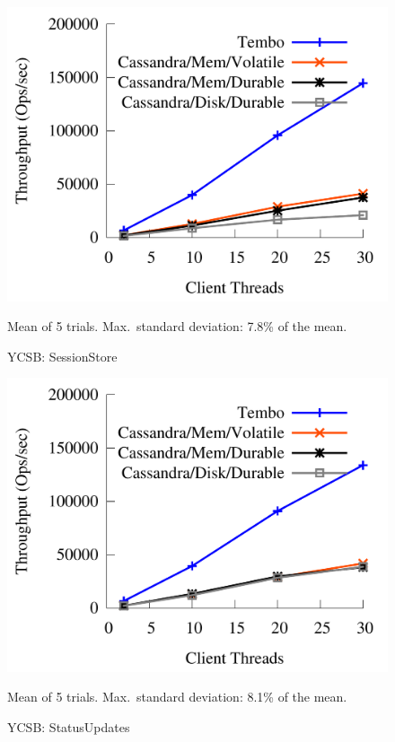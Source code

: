 \begin{figure}[t]
\begin{minipage}[b]{0.49\textwidth}
\centerline{\includegraphics[width=0.85\columnwidth]{figs/ycsb-a}}
\begin{captiontext}
 \centerline{Mean of 5 trials. Max.\ standard deviation: 7.8\% of the
   mean.}
\end{captiontext}
\caption[Yahoo Cloud Serving Benchmark: SessionStore]{YCSB: SessionStore}
\label{fig:ycsb_session_store}
\end{minipage}
\begin{minipage}[b]{0.49\textwidth}
\centerline{\includegraphics[width=0.85\columnwidth]{figs/ycsb-d}}
\begin{captiontext}
\centerline{Mean of 5 trials. Max.\ standard deviation: 8.1\% of the
  mean.}
\end{captiontext}
\caption[Yahoo Cloud Serving Benchmark: StatusUpdates]{YCSB: StatusUpdates}
\label{fig:ycsb_status_updates}
\end{minipage}
\end{figure}


